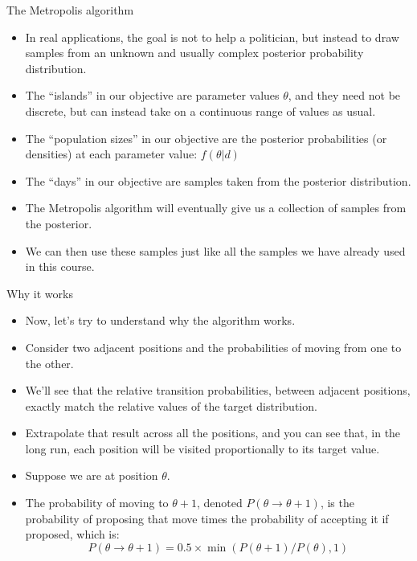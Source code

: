 \documentclass[handout]{beamer}
\begin{document}
\begin{frame}{The Metropolis algorithm}
\scriptsize{

\begin{itemize}
\item In real applications, the goal is not to help a politician, but instead to draw samples from an unknown and usually complex posterior probability distribution.
\item The ``islands'' in our objective are parameter values $\theta$, and they need not be discrete, but can instead take on a continuous range of values as usual.
\item The ``population sizes'' in our objective are the posterior probabilities (or densities) at each parameter value: $f(\theta|d)$
\item The ``days'' in our objective are samples taken from the posterior distribution.

\item The Metropolis algorithm will eventually give us a collection of samples from the posterior. 

\item We can then use these samples just like all the samples we have already used in this course.

\end{itemize}


} 
\end{frame}



\begin{frame}{Why it works}
\scriptsize{

\begin{itemize}
\item Now, let's try to understand why the algorithm works.

\item Consider two adjacent positions and the probabilities of moving from one to the other. 
\item We'll see that the relative transition probabilities, between adjacent positions, exactly match the relative values of the target distribution.

\item Extrapolate that result across all the positions, and you can see that, in the long run, each position will be visited proportionally to its target value.

\item Suppose we are at position $\theta$. 

\item The probability of moving to $\theta+ 1$, denoted
$P(\theta \rightarrow \theta + 1)$, is the probability of proposing that move times the probability of
accepting it if proposed, which is:
\begin{displaymath}
P(\theta \rightarrow \theta + 1) = 0.5 \times \min(P(\theta+ 1)/P(\theta),1) 
\end{displaymath}



\end{itemize}


} 
\end{frame}
\end{document}
